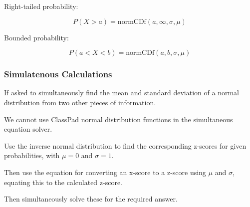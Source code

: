 \documentclass[a4paper,11pt]{article}
\begin{document}
Right-tailed probability:

$$
P(X > a) = \text{normCDf}(a, \infty, \sigma, \mu)
$$

Bounded probability:

$$
P(a < X < b) = \text{normCDf}(a, b, \sigma, \mu)
$$


\subsubsection{Simulatenous Calculations}

If asked to simultaneously find the mean and standard deviation of a normal
distribution from two other pieces of information.

We cannot use ClassPad normal distribution functions in the simultaneous
equation solver.

Use the inverse normal distribution to find the corresponding z-scores for
given probabilities, with $\mu = 0$ and $\sigma = 1$.

Then use the equation for converting an x-score to a z-score using $\mu$ and
$\sigma$, equating this to the calculated z-score.

Then simultaneously solve these for the required answer.
\end{document}
